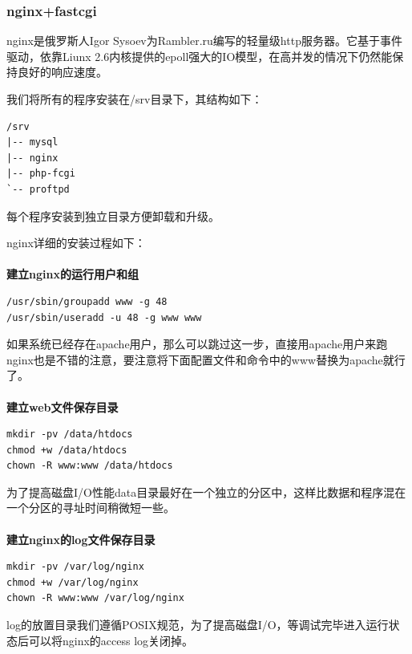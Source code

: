 \documentclass{article}
\begin{document}
\hypertarget{toc5}{}
\subsubsection{nginx+fastcgi}
nginx是俄罗斯人Igor Sysoev为Rambler.ru编写的轻量级http服务器。它基于事件驱动，依靠Liunx 2.6内核提供的epoll强大的IO模型，在高并发的情况下仍然能保持良好的响应速度。

我们将所有的程序安装在/srv目录下，其结构如下：

\begin{verbatim}
/srv
|-- mysql
|-- nginx
|-- php-fcgi
`-- proftpd
\end{verbatim}
每个程序安装到独立目录方便卸载和升级。

nginx详细的安装过程如下：

\paragraph{}\textbf{建立nginx的运行用户和组}\\

\begin{verbatim}
/usr/sbin/groupadd www -g 48
/usr/sbin/useradd -u 48 -g www www 
\end{verbatim}
如果系统已经存在apache用户，那么可以跳过这一步，直接用apache用户来跑nginx也是不错的注意，要注意将下面配置文件和命令中的www替换为apache就行了。

\paragraph{}\textbf{建立web文件保存目录}\\

\begin{verbatim}
mkdir -pv /data/htdocs
chmod +w /data/htdocs
chown -R www:www /data/htdocs 
\end{verbatim}
为了提高磁盘I/O性能data目录最好在一个独立的分区中，这样比数据和程序混在一个分区的寻址时间稍微短一些。

\paragraph{}\textbf{建立nginx的log文件保存目录}\\

\begin{verbatim}
mkdir -pv /var/log/nginx
chmod +w /var/log/nginx
chown -R www:www /var/log/nginx 
\end{verbatim}
log的放置目录我们遵循POSIX规范，为了提高磁盘I/O，等调试完毕进入运行状态后可以将nginx的access log关闭掉。
\end{document}
